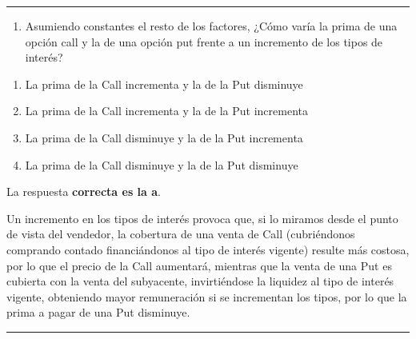\documentclass[
  letterpaper,
  DIV=11,
  numbers=noendperiod]{scrreprt}
\providecommand{\tightlist}{%
  \setlength{\itemsep}{0pt}\setlength{\parskip}{0pt}}\usepackage{longtable,booktabs,array}
\begin{document}
\begin{center}\rule{0.5\linewidth}{0.5pt}\end{center}

\begin{enumerate}
\def\labelenumi{\arabic{enumi}.}
\setcounter{enumi}{38}
\tightlist
\item
  Asumiendo constantes el resto de los factores, ¿Cómo varía la prima de
  una opción call y la de una opción put frente a un incremento de los
  tipos de interés?
\end{enumerate}

\begin{enumerate}
\def\labelenumi{\alph{enumi})}
\item
  La prima de la Call incrementa y la de la Put disminuye
\item
  La prima de la Call incrementa y la de la Put incrementa
\item
  La prima de la Call disminuye y la de la Put incrementa
\item
  La prima de la Call disminuye y la de la Put disminuye
\end{enumerate}

\begin{tcolorbox}[enhanced jigsaw, left=2mm, opacityback=0, colback=white, breakable, arc=.35mm, bottomrule=.15mm, rightrule=.15mm, toprule=.15mm, leftrule=.75mm, colframe=quarto-callout-tip-color-frame]
\begin{minipage}[t]{5.5mm}
\textcolor{quarto-callout-tip-color}{\faLightbulb}
\end{minipage}%
\begin{minipage}[t]{\textwidth - 5.5mm}

La respuesta \textbf{correcta es la a}.

Un incremento en los tipos de interés provoca que, si lo miramos desde
el punto de vista del vendedor, la cobertura de una venta de Call
(cubriéndonos comprando contado financiándonos al tipo de interés
vigente) resulte más costosa, por lo que el precio de la Call aumentará,
mientras que la venta de una Put es cubierta con la venta del
subyacente, invirtiéndose la liquidez al tipo de interés vigente,
obteniendo mayor remuneración si se incrementan los tipos, por lo que la
prima a pagar de una Put disminuye.

\end{minipage}%
\end{tcolorbox}

\begin{center}\rule{0.5\linewidth}{0.5pt}\end{center}
\end{document}
